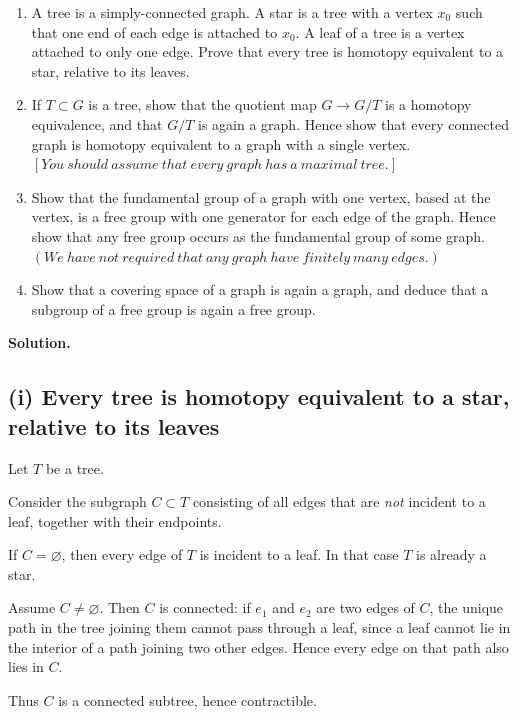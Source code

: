 \documentclass[12pt,a4paper]{article}
\theoremstyle{notespace}
\begin{document}
\begin{enumerate}
	\item[(i)] A tree is a simply-connected graph. A star is a tree with a vertex \(x_0\) such that one end of each edge is attached to \(x_0\). A leaf of a tree is a vertex attached to only one edge. Prove that every tree is homotopy equivalent to a star, relative to its leaves.
	
	\item[(ii)] If \(T\subset G\) is a tree, show that the quotient map \(G\to G/T\) is a homotopy equivalence, and that \(G/T\) is again a graph. Hence show that every connected graph is homotopy equivalent to a graph with a single vertex. \([You\ should\ assume\ that\ every\ graph\ has\ a\ maximal\ tree.]\)
	
	\item[(iii)] Show that the fundamental group of a graph with one vertex, based at the vertex, is a free group with one generator for each edge of the graph. Hence show that any free group occurs as the fundamental group of some graph. \((We\ have\ not\ required\ that\ any\ graph\ have\ finitely\ many\ edges.)\)
	
	\item[(iv)] Show that a covering space of a graph is again a graph, and deduce that a subgroup of a free group is again a free group.
\end{enumerate}

\medskip

\textbf{Solution.}

\subsection*{(i) Every tree is homotopy equivalent to a star, relative to its leaves}
Let \(T\) be a tree.

Consider the subgraph \(C\subset T\) consisting of all edges that are \emph{not} incident to a leaf, together with their endpoints.

If \(C=\varnothing\), then every edge of \(T\) is incident to a leaf. In that case \(T\) is already a star.

Assume \(C\neq \varnothing\). Then \(C\) is connected: if \(e_1\) and \(e_2\) are two edges of \(C\), the unique path in the tree joining them cannot pass through a leaf, since a leaf cannot lie in the interior of a path joining two other edges. Hence every edge on that path also lies in \(C\).

Thus \(C\) is a connected subtree, hence contractible.
\end{document}
